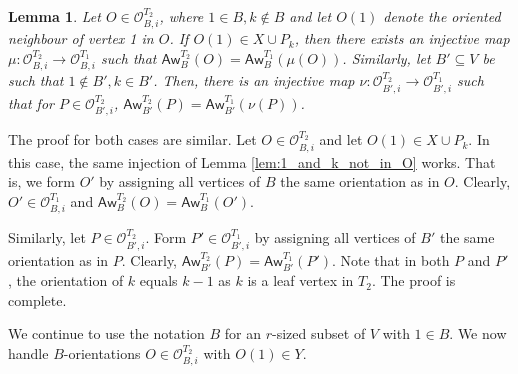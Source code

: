 \documentclass[12pt]{article}
\def\eod{\vrule height 6pt width 5pt depth 0pt}
\newenvironment{proof}{\noindent {\bf Proof:} \hspace{.2em}}
                      {\hspace*{\fill}{\eod}}
\newtheorem{lemma}[theorem]{Lemma}
\newcommand{\sO}{  \mathcal{ O}}
\newcommand{\awy}{\mathsf{Aw}}
\begin{document}
\begin{lemma}
  \label{B'_and_B_easy_case}
Let $O \in \sO_{B,i}^{T_2}$, where $1 \in B, k \not\in B$ and let $O(1)$ 
denote the oriented neighbour 
of vertex 1 in $O$.  If $O(1) \in X \cup P_k$, then there exists 
an injective map $\mu: \sO_{B,i}^{T_2} \rightarrow \sO_{B,i}^{T_1}$ such
that $\awy_B^{T_2}(O) = \awy_B^{T_1}(\mu(O))$.  
Similarly, let $B' \subseteq V$ be such that $1 \not\in B', k \in B'$.   Then, 
there is an injective map
$\nu: \sO_{B',i}^{T_2} \rightarrow \sO_{B',i}^{T_1}$ such that for
$P \in \sO_{B',i}^{T_2}$, $\awy_{B'}^{T_2}(P) = \awy_{B'}^{T_1}(\nu(P))$.
\end{lemma}
\begin{proof}
The proof for both cases are similar.
Let $O \in \sO_{B,i}^{T_2}$ and let $O(1) \in X \cup P_k$.
In this case, the same injection of Lemma \ref{lem:1_and_k_not_in_O}
works.  That is, we form $O'$ by assigning all vertices of $B$ the 
same orientation as in $O$.  Clearly, $O' \in \sO_{B,i}^{T_1}$  and
$\awy_B^{T_2}(O) = \awy_B^{T_1}(O')$.

Similarly, let $P \in \sO_{B',i}^{T_2}$.  Form 
$P' \in \sO_{B',i}^{T_1}$ 
by assigning all vertices of $B'$ the same orientation as in $P$.
Clearly, 
$\awy_{B'}^{T_2}(P) = \awy_{B'}^{T_1}(P')$.  Note that in both $P$ and $P'$,
the orientation of $k$ equals $k-1$ as $k$ is a leaf vertex in $T_2$.  The proof is complete.
\end{proof}

\vspace{2 mm}

We continue to use the notation $B$ for an $r$-sized subset of $V$ with
$1 \in B$.  We now handle $B$-orientations $O \in \sO_{B,i}^{T_2}$ with $O(1) \in Y$.
\end{document}
